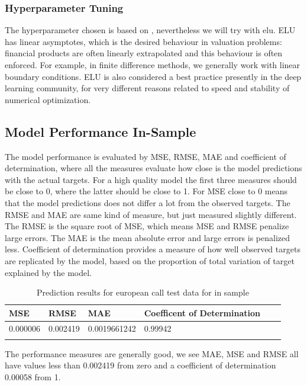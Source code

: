 \subsubsection{Hyperparameter Tuning}
The hyperparameter chosen is based on \parencite{HirsaAli2019}, nevertheless we will try with elu. ELU has linear asymptotes, which is the desired behaviour in valuation problems: financial products are often linearly extrapolated and this behaviour is often enforced. For example, in finite difference methods, we generally work with linear boundary conditions. ELU is also considered a best practice presently in the deep learning community, for very different reasons related to speed and stability of numerical optimization.


\subsection{Model Performance In-Sample}
The model performance is evaluated by MSE, RMSE, MAE and coefficient of determination, where all the measures evaluate how close is the model predictions with the actual targets. For a high quality model the first three measures should be close to 0, where the latter should be close to 1. For MSE close to 0 means that the model predictions does not differ a lot from the observed targets. The RMSE and MAE are same kind of measure, but just measured slightly different. The RMSE is the square root of MSE, which means MSE and RMSE penalize large errors. The MAE is the mean absolute error and large errors is penalized less. Coefficient of determination provides a measure of how well observed targets are replicated by the model, based on the proportion of total variation of target explained by the model.

\begin{table}[th]
\caption{Prediction results for european call test data for in sample}
\label{tab:euroParRange}
\centering
\begin{tabular}{l l l l l l }
\toprule
\textbf{MSE} & \textbf{RMSE} & \textbf{MAE} & \textbf{Coefficent of Determination} \\
\midrule
0.000006 & 0.002419 & 0.0019661242 & 0.99942\\
\bottomrule\\
\end{tabular}
\end{table}

The performance measures are generally good, we see MAE, MSE and RMSE all have values less than 0.002419 from zero and a coefficient of determination 0.00058 from 1. 

